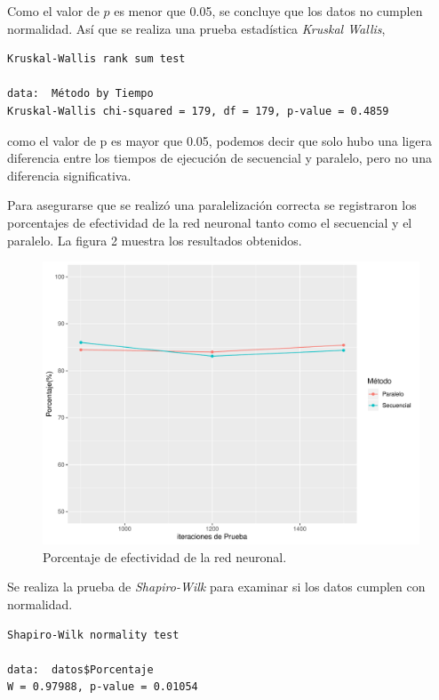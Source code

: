 \documentclass[10pt,a4paper]{article}
\begin{document}
Como el valor de $p$ es menor que 0.05, se concluye que los datos no cumplen normalidad. Así que se realiza una prueba estadística \emph{Kruskal Wallis}, 

\begin{lstlisting}
Kruskal-Wallis rank sum test

data:  Método by Tiempo
Kruskal-Wallis chi-squared = 179, df = 179, p-value = 0.4859
\end{lstlisting}
\vspace{0.5cm}

como el valor de p es mayor que 0.05, podemos decir que solo hubo una ligera diferencia entre los tiempos de ejecución de secuencial y paralelo, pero no una diferencia significativa. 

Para asegurarse que se realizó una paralelización correcta se registraron los porcentajes de efectividad de la red neuronal tanto como el secuencial y el paralelo. La figura 2 muestra los resultados obtenidos.
\begin{figure}[H]
  \centering
  \includegraphics[scale=.7]{tarea2}
  \caption{Porcentaje de efectividad de la red neuronal.}
\end{figure}


Se realiza la prueba de \emph{Shapiro-Wilk} para examinar si los datos cumplen con normalidad. 
\begin{lstlisting}
Shapiro-Wilk normality test

data:  datos$Porcentaje
W = 0.97988, p-value = 0.01054

\end{lstlisting}
\vspace{0.5cm}
\end{document}
